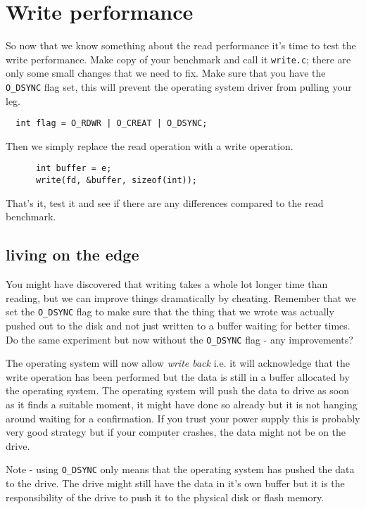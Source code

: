 \documentclass[a4paper,11pt]{article}
\begin{document}
\section{Write performance}

So now that we know something about the read performance it's time to
test the write performance. Make copy of your benchmark and call it
{\tt write.c}; there are only some small changes that we need to
fix. Make sure that you have the {\tt O\_DSYNC} flag set, this will
prevent the operating system driver from pulling your leg.


\begin{lstlisting}
  int flag = O_RDWR | O_CREAT | O_DSYNC;  
\end{lstlisting}

Then we simply replace the read operation with a write operation. 

\begin{lstlisting}
      int buffer = e;
      write(fd, &buffer, sizeof(int));
\end{lstlisting}

That's it, test it and see if there are any differences compared to
the read benchmark.

\subsection*{living on the edge}


You might have discovered that writing takes a whole lot longer
time than reading, but we can improve things dramatically by
cheating. Remember that we set the {\tt O\_DSYNC} flag to make sure that
the thing that we wrote was actually pushed out to the disk and not
just written to a buffer waiting for better times. Do the same
experiment but now without the {\tt O\_DSYNC} flag - any improvements?

The operating system will now allow {\em write back} i.e. it will
acknowledge that the write operation has been performed but the data
is still in a buffer allocated by the operating system. The operating
system will push the data to drive as soon as it finds a suitable
moment, it might have done so already but it is not hanging around
waiting for a confirmation. If you trust your power supply this is
probably very good strategy but if your computer crashes, the data
might not be on the drive.

Note - using {\tt O\_DSYNC} only means that the operating system has
pushed the data to the drive. The drive might still have the data in
it's own buffer but it is the responsibility of the drive to push it to
the physical disk or flash memory.
\end{document}
